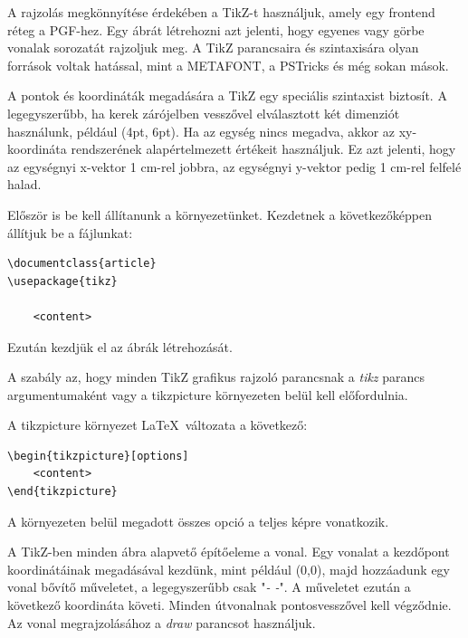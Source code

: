 


A rajzolás megkönnyítése érdekében a TikZ-t használjuk, amely egy frontend réteg a PGF-hez. Egy ábrát létrehozni azt jelenti, hogy egyenes vagy görbe vonalak sorozatát rajzoljuk meg. A TikZ parancsaira és szintaxisára olyan források voltak hatással, mint a METAFONT, a PSTricks és még sokan mások.

\noindent
A pontok és koordináták megadására a TikZ egy speciális szintaxist biztosít. A legegyszerűbb, ha kerek zárójelben vesszővel elválasztott két dimenziót használunk, például (4pt, 6pt). Ha az egység nincs megadva, akkor az xy-koordináta rendszerének alapértelmezett értékeit használjuk. Ez azt jelenti, hogy az egységnyi x-vektor 1 cm-rel jobbra, az egységnyi y-vektor pedig 1 cm-rel felfelé halad. 



Először is be kell állítanunk a környezetünket. Kezdetnek a következőképpen állítjuk be a fájlunkat:

\begin{lstlisting}[style=latex]
\documentclass{article}
\usepackage{tikz}

	<content>

\end{lstlisting}

\noindent
Ezután kezdjük el az ábrák létrehozását. 



A szabály az, hogy minden TikZ grafikus rajzoló parancsnak a \textit{tikz} parancs argumentumaként vagy a {tikzpicture} környezeten belül kell előfordulnia. 

\noindent
A {tikzpicture} környezet \LaTeX\ változata a következő:

\begin{lstlisting}[style=latex]
\begin{tikzpicture}[options]
	<content>
\end{tikzpicture}
\end{lstlisting}


\noindent
A környezeten belül megadott összes opció a teljes képre vonatkozik.

\noindent
A TikZ-ben minden ábra alapvető építőeleme a vonal. Egy vonalat a kezdőpont koordinátáinak megadásával kezdünk, mint például (0,0), majd hozzáadunk egy vonal bővítő műveletet, a legegyszerűbb csak "\textit{- -}". A műveletet ezután a következő koordináta követi. Minden útvonalnak pontosvesszővel kell végződnie. Az vonal megrajzolásához a \textit{draw} parancsot használjuk.

